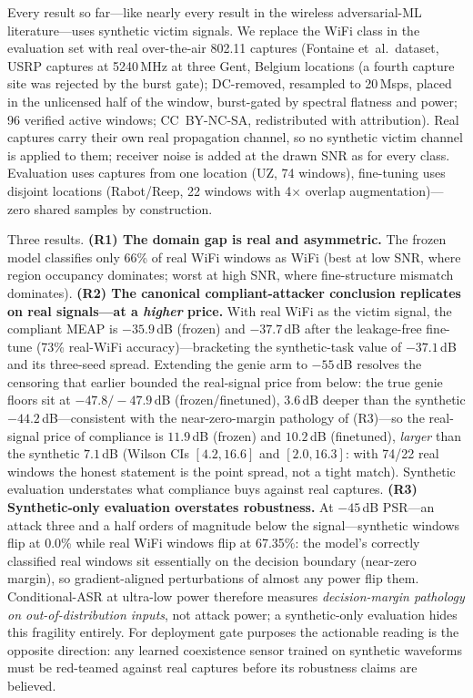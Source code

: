 \documentclass[review]{elsarticle}
\begin{document}
Every result so far---like nearly every result in the wireless
adversarial-ML literature---uses synthetic victim signals. We replace the
WiFi class in the evaluation set with real over-the-air 802.11 captures
(Fontaine et~al.\ dataset, USRP captures at 5240\,MHz at three Gent,
Belgium locations (a fourth capture site was rejected by the burst gate); DC-removed, resampled to 20\,Msps, placed in the
unlicensed half of the window, burst-gated by spectral flatness and power;
96 verified active windows; CC~BY-NC-SA, redistributed with
attribution). Real captures carry their own real propagation channel, so
no synthetic victim channel is applied to them; receiver noise is added at
the drawn SNR as for every class. Evaluation uses captures from one
location (UZ, 74 windows), fine-tuning uses disjoint locations
(Rabot/Reep, 22 windows with 4$\times$ overlap augmentation)---zero
shared samples by construction.

Three results. \textbf{(R1) The domain gap is real and asymmetric.} The
frozen model classifies only 66\% of real WiFi windows as WiFi (best at
low SNR, where region occupancy dominates; worst at high SNR, where
fine-structure mismatch dominates). \textbf{(R2) The canonical compliant-attacker conclusion replicates on
real signals---at a \emph{higher} price.} With real WiFi as the victim
signal, the compliant MEAP is $-35.9$\,dB (frozen) and $-37.7$\,dB after
the leakage-free fine-tune (73\% real-WiFi accuracy)---bracketing the
synthetic-task value of $-37.1$\,dB and its three-seed spread. Extending
the genie arm to $-55$\,dB resolves the censoring that earlier bounded
the real-signal price from below: the true genie floors sit at
$-47.8/-47.9$\,dB (frozen/finetuned), $3.6$\,dB deeper than the
synthetic $-44.2$\,dB---consistent with the near-zero-margin pathology
of (R3)---so the real-signal price of compliance is $11.9$\,dB (frozen)
and $10.2$\,dB (finetuned), \emph{larger} than the synthetic $7.1$\,dB
(Wilson CIs $[4.2,16.6]$ and $[2.0,16.3]$: with 74/22 real windows the
honest statement is the point spread, not a tight match). Synthetic
evaluation understates what compliance buys against real captures. \textbf{(R3) Synthetic-only evaluation
overstates robustness.} At $-45$\,dB PSR---an attack three and a half
orders of magnitude below the signal---synthetic windows flip at 0.0\%
while real WiFi windows flip at 67.35\%: the model's correctly classified
real windows sit essentially on the decision boundary (near-zero margin),
so gradient-aligned perturbations of almost any power flip them.
Conditional-ASR at ultra-low power therefore measures \emph{decision-margin
pathology on out-of-distribution inputs}, not attack power; a
synthetic-only evaluation hides this fragility entirely. For deployment
gate purposes the actionable reading is the opposite direction: any
learned coexistence sensor trained on synthetic waveforms must be
red-teamed against real captures before its robustness claims are
believed.
\end{document}
